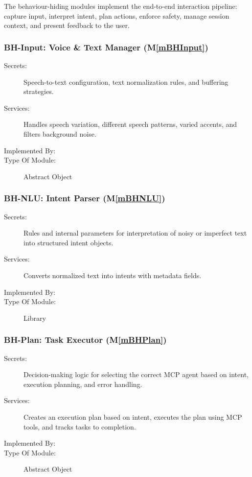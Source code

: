 \documentclass[12pt, titlepage]{article}
\newcommand{\mref}[1]{M\ref{#1}}
\begin{document}
The behaviour-hiding modules implement the end-to-end interaction pipeline:
capture input, interpret intent, plan actions, enforce safety, manage session
context, and present feedback to the user.

\subsubsection{BH-Input: Voice \& Text Manager (\mref{mBHInput})}
\begin{description}
\item[Secrets:] Speech-to-text configuration, text normalization rules, and
buffering strategies.
\item[Services:] Handles speech variation, different speech patterns, varied
accents, and filters background noise.
\item[Implemented By:] \progname{}
\item[Type Of Module:] Abstract Object
\end{description}

\subsubsection{BH-NLU: Intent Parser (\mref{mBHNLU})}
\begin{description}
\item[Secrets:] Rules and internal parameters for interpretation of noisy or
imperfect text into structured intent objects.
\item[Services:] Converts normalized text into intents with metadata fields.
\item[Implemented By:] \progname{}
\item[Type Of Module:] Library
\end{description}

\subsubsection{BH-Plan: Task Executor (\mref{mBHPlan})}
\begin{description}
\item[Secrets:] Decision-making logic for selecting the correct MCP agent based
on intent, execution planning, and error handling.
\item[Services:] Creates an execution plan based on intent, executes the plan
using MCP tools, and tracks tasks to completion.
\item[Implemented By:] \progname{}
\item[Type Of Module:] Abstract Object
\end{description}
\end{document}
